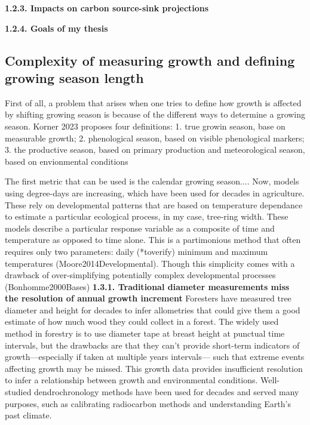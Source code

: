\documentclass{article}
\begin{document}
\textbf{1.2.3. Impacts on carbon source-sink projections} 

\textbf{1.2.4. Goals of my thesis} 

\subsection{Complexity of measuring growth and defining growing season length}
First of all, a problem that arises when one tries to define how growth is affected by shifting growing season is because of the different ways to determine a growing season. Korner 2023 proposes four definitions: 1. true growin season, base on measurable growth; 2. phenological season, based on visible phenological markers; 3. the productive season, based on primary production and meteorological season, based on envionmental conditions %

The first metric that can be used is the calendar growing season.... Now, models using degree-days are increasing, which have been used for decades in agriculture. These rely on developmental patterns that are based on temperature dependance to estimate a particular ecological process, in my case, tree-ring width. These models describe a particular response variable as a composite of time and temperature as opposed to time alone. This is a partimonious method that often requires only two parameters: daily (*toverify) minimum and maximum temperatures (Moore2014Developmental).  Though this simplicity comes with a drawback of over-simplifying potentially complex developmental processes (Bonhomme2000Bases)
\textbf{1.3.1. Traditional diameter measurements miss the resolution of annual growth increment}
Foresters have measured tree diameter and height for decades to infer allometries that could give them a good estimate of how much wood they could collect in a forest. The widely used method in forestry is to use diameter tape at breast height at punctual time intervals, but the drawbacks are that they can't provide short-term indicators of growth---especially if taken at multiple years intervals--- such that extreme events affecting growth may be missed. This growth data provides insufficient resolution to infer a relationship between growth and environmental conditions. Well-studied dendrochronology methods have been used for decades and served many purposes, such as calibrating radiocarbon methods and understanding Earth's past climate. 
\end{document}
